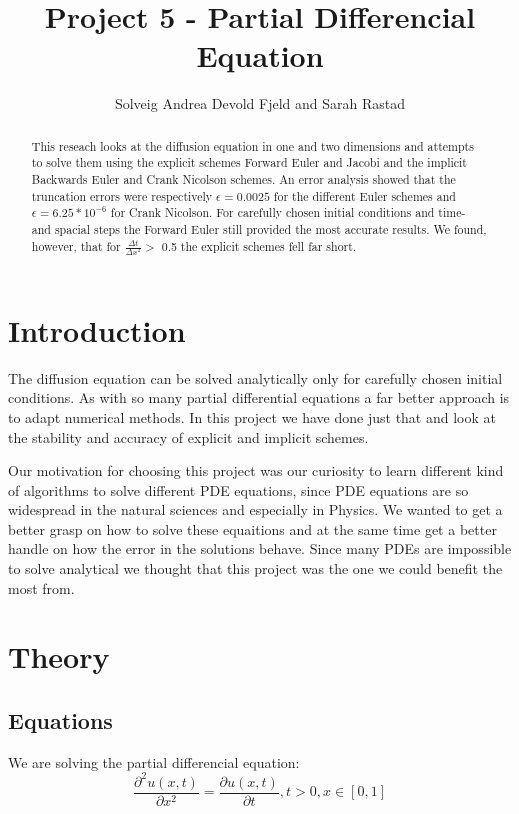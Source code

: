 \documentclass[a4paper,10pt]{article}
\title{Project 5 - Partial Differencial Equation}
\author{Solveig Andrea Devold Fjeld and Sarah Rastad}
\begin{document}
\maketitle

\begin{abstract}
This reseach looks at the diffusion equation in one and two dimensions and attempts to solve them using the explicit schemes Forward Euler and Jacobi and the implicit Backwards Euler and Crank Nicolson schemes.
An error analysis showed that the truncation errors were respectively $\epsilon = 0.0025$ for the different Euler schemes and $\epsilon = 6.25*10^{-6}$ for Crank Nicolson. For carefully chosen initial conditions and time- and spacial steps the Forward Euler still provided the most accurate results.
We found, however, that for $\frac{\Delta t}{\Delta x^2} > $ 0.5 the explicit schemes fell far short.
\end{abstract}

\section{Introduction}
The diffusion equation can be solved analytically only for carefully chosen initial conditions. As with so many partial differential equations a far better approach is to adapt numerical methods.
In this project we have done just that and look at the stability and accuracy of explicit and implicit schemes.

Our motivation for choosing this project was our curiosity to learn different kind of algorithms to solve different PDE equations, since PDE equations
are so widespread in the natural sciences and especially in Physics. We wanted to get a better grasp on how to solve these equaitions and at the same time
get a better handle on how the error in the solutions behave. Since many PDEs are impossible to solve analytical we thought that this project
was the one we could benefit the most from.

\section{Theory}
\subsection{Equations}
We are solving the partial differencial equation:
\begin{equation}
  \frac{\partial^2 u(x,t)}{\partial x^2} =\frac{\partial u(x,t)}{\partial t}, t> 0, x\in [0,1]
  \label{eq:PartDiff}
\end{equation}
\end{document}
